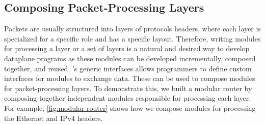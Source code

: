 \documentclass[letterpaper,twocolumn,10pt]{article}
\begin{document}
\subsection{Composing Packet-Processing Layers}
\label{subsection:composing-packet-processing-layers}
Packets are usually structured into layers of protocols headers, where
each layer is specialized for a specific role and has a specific
layout. Therefore, writing modules for processing a layer or a set of
layers is a natural and desired way to develop dataplane programs as
these modules can be developed incrementally, composed together, and
reused.
\uarch's generic interfaces allows programmers to define custom
interfaces for modules to exchange data. These can be used to compose
\ulang modules for packet-processing layers. To demonstrate this, we
built a modular router by composing together independent modules
responsible for processing each layer. For example,
\cref{fig:modular-router} shows how we compose modules for processing
the Ethernet and IPv4 headers.
\end{document}
